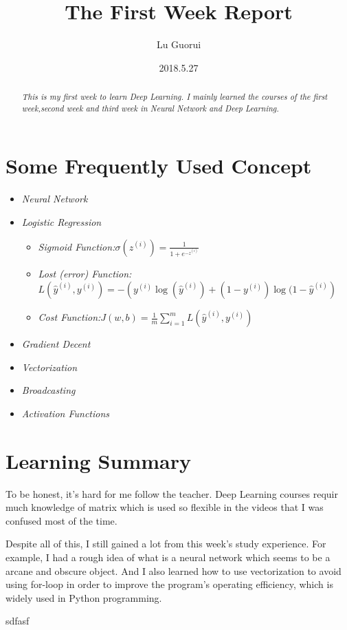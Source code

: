 \documentclass{article}
\title{The First Week Report}
\author{Lu Guorui}
\date{2018.5.27}
\begin{document}
\maketitle
\tableofcontents
\newpage

\begin{abstract}
\textit{This is my first week to learn Deep Learning. I mainly learned the courses of the first week,second week and third week in Neural Network and Deep Learning.}
\end{abstract}

\section{Some Frequently Used Concept}
{
\tiny 
\begin{itemize}

\item \textit{Neural Network}
\item \textit{Logistic Regression}

\begin{itemize}

\item \textit{Sigmoid Function:$\sigma(z^{(i)})= \frac{1}{ 1+e^{-z^{(i)}}}$}
\item \textit{Lost (error) Function:$L(\hat{y}^{(i)},y^{(i)})=-(y^{(i)}\log{(\hat{y}^{(i)})}+(1-y^{(i)})\log{(1-\hat{y}^{(i)}})$}
\item \textit{Cost Function:$J(w,b)=\frac{1}{m}\sum\limits_{i=1}^mL(\hat{y}^{(i)},y^{(i)})$}
\end{itemize}

\item \textit{Gradient Decent}
\item \textit{Vectorization}
\item \textit{Broadcasting}
\item \textit{Activation Functions}
\end{itemize}
}

\section{Learning Summary}
    To be honest, it's hard for me follow the teacher. Deep Learning courses requir much knowledge of matrix which is used so flexible in the videos that I was confused most of the time.\par
    Despite all of this, I still gained a lot from this week's study experience. For example, I had a rough idea of what is a neural network which seems to be a arcane and obscure object. And I also learned how to use vectorization to avoid using for-loop in order to improve the program's operating efficiency, which is widely used in Python programming.\par
    \parallel sdfasf


 
\end{document}
